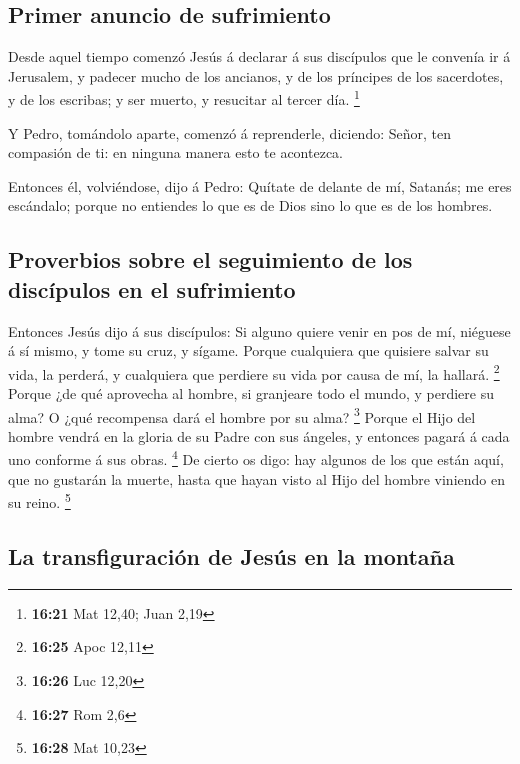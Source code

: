 \hypertarget{primer-anuncio-de-sufrimiento}{%
\subsection{Primer anuncio de
sufrimiento}\label{primer-anuncio-de-sufrimiento}}

 Desde aquel tiempo comenzó Jesús á declarar á sus
discípulos que le convenía ir á Jerusalem, y padecer mucho de los
ancianos, y de los príncipes de los sacerdotes, y de los escribas; y ser
muerto, y resucitar al tercer día. \footnote{\textbf{16:21} Mat 12,40;
  Juan 2,19}

 Y Pedro, tomándolo aparte, comenzó á reprenderle,
diciendo: Señor, ten compasión de ti: en ninguna manera esto te
acontezca.

 Entonces él, volviéndose, dijo á Pedro: Quítate de
delante de mí, Satanás; me eres escándalo; porque no entiendes lo que es
de Dios sino lo que es de los hombres.

\hypertarget{proverbios-sobre-el-seguimiento-de-los-discuxedpulos-en-el-sufrimiento}{%
\subsection{Proverbios sobre el seguimiento de los discípulos en el
sufrimiento}\label{proverbios-sobre-el-seguimiento-de-los-discuxedpulos-en-el-sufrimiento}}

 Entonces Jesús dijo á sus discípulos: Si alguno quiere
venir en pos de mí, niéguese á sí mismo, y tome su cruz, y sígame.
 Porque cualquiera que quisiere salvar su vida, la
perderá, y cualquiera que perdiere su vida por causa de mí, la hallará.
\footnote{\textbf{16:25} Apoc 12,11}  Porque ¿de qué
aprovecha al hombre, si granjeare todo el mundo, y perdiere su alma? O
¿qué recompensa dará el hombre por su alma? \footnote{\textbf{16:26} Luc
  12,20}  Porque el Hijo del hombre vendrá en la gloria
de su Padre con sus ángeles, y entonces pagará á cada uno conforme á sus
obras. \footnote{\textbf{16:27} Rom 2,6}  De cierto os
digo: hay algunos de los que están aquí, que no gustarán la muerte,
hasta que hayan visto al Hijo del hombre viniendo en su reino.
\footnote{\textbf{16:28} Mat 10,23}

\hypertarget{la-transfiguraciuxf3n-de-jesuxfas-en-la-montauxf1a}{%
\subsection{La transfiguración de Jesús en la
montaña}\label{la-transfiguraciuxf3n-de-jesuxfas-en-la-montauxf1a}}

